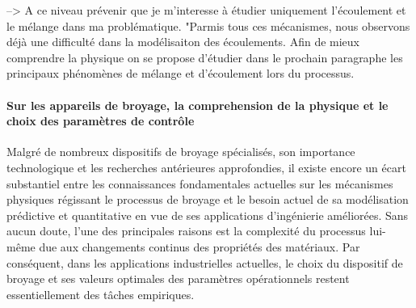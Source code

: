 --> A ce niveau prévenir que je m'interesse à étudier uniquement l'écoulement et le mélange dans ma problématique.
"Parmis tous ces mécanismes, nous observons déjà une difficulté dans la modélisaiton des écoulements. Afin de mieux comprendre la physique on se propose d'étudier dans le prochain paragraphe les principaux phénomènes de mélange et d'écoulement lors du processus.




\paragraph{Sur les appareils de broyage, la comprehension de la physique et le choix des paramètres de contrôle}

Malgré de nombreux dispositifs de broyage spécialisés, son importance technologique et les recherches antérieures approfondies, il existe encore un écart substantiel entre les connaissances fondamentales actuelles sur les mécanismes physiques régissant le processus de broyage et le besoin actuel de sa modélisation prédictive et quantitative en vue de ses applications d'ingénierie améliorées. Sans aucun doute, l'une des principales raisons est la complexité du processus lui-même due aux changements continus des propriétés des matériaux. Par conséquent, dans les applications industrielles actuelles, le choix du dispositif de broyage et ses valeurs optimales des paramètres opérationnels restent essentiellement des tâches empiriques.



